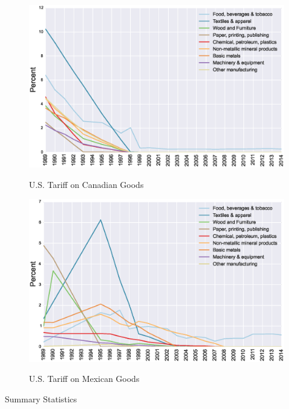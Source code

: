 \begin{figure}[htpb]\centering
\caption{\small U.S. Tariff on Canadian Goods}\vspace{0.2cm}
\includegraphics[scale=0.5]{tau_usa_can}
\label{fig:usa_can}
\end{figure}
 
\begin{figure}[htpb]\centering
\caption{\small U.S. Tariff on Mexican Goods}\vspace{0.2cm}
\includegraphics[scale=0.5]{tau_usa_mex}
\label{fig:usa_mex}
\end{figure}

\begin{center}
\begin{table}

\caption{Summary Statistics}
\label{tab:sumstats}
\end{table}
\end{center}




